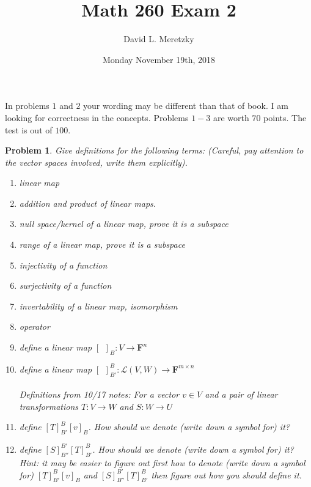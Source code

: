 \documentclass{article}
\title{ \vspace{-10ex} %
Math 260 Exam 2
}
\author{David L. Meretzky
}
\date{%
Monday November 19th, 2018
}
\theoremstyle{problemstyle}
\newtheorem{problem}{Problem}
\theoremstyle{problemstyle}
\newtheorem{solution}{Solution}
\theoremstyle{problemstyle}
\begin{document}
\maketitle

In problems $1$ and $2$ your wording may be different than that of book. I am looking for correctness in the concepts. Problems $1-3$ are worth $70$ points.  The test is out of $100$. 

\begin{problem}
Give definitions for the following terms: (Careful, pay attention to the vector spaces involved, write them explicitly). 
\begin{enumerate}
\item linear map
\item addition and product of linear maps.    
\item null space/kernel of a linear map, prove it is a subspace
\item range of a linear map, prove it is a subspace
\item injectivity of a function
\item surjectivity of a function
\item invertability of a linear map, isomorphism
\item operator
\item define a linear map $[ \ \ ]_B:V \rightarrow \textbf{F}^n$ 
\item define a linear map $[ \ \ ]_{B'}^B:\mathscr{L}(V,W) \rightarrow \textbf{F}^{m\times n}$\\\\
Definitions from 10/17 notes: For a vector $v \in V$ and a pair of linear transformations $T:V \rightarrow W$ and $S:W\rightarrow U$\\
\item define $[T]_{B'}^B[v]_B$. How should we denote (write down a symbol for) it?
\item define $[S]_{B''}^{B'}[T]_{B'}^B$. How should we denote (write down a symbol for) it?
Hint: it may be easier to figure out first how to denote (write down a symbol for) $[T]_{B'}^B[v]_B$ and $[S]_{B''}^{B'}[T]_{B'}^B$ then figure out how you should define it. 
\end{enumerate}
\end{problem}

% 
\end{document}
